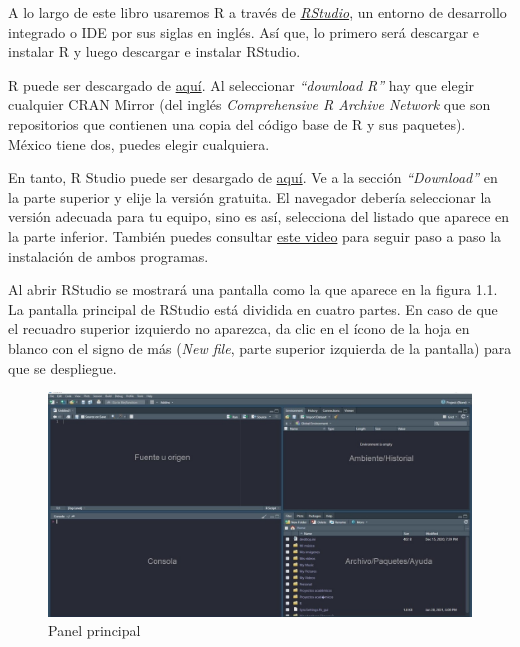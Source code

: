 \documentclass[
  11pt,
  oneside]{book}
\begin{document}
A lo largo de este libro usaremos R a través de \href{https://es.wikipedia.org/wiki/RStudio}{\emph{RStudio}}, un entorno de desarrollo integrado o IDE por sus siglas en inglés. Así que, lo primero será descargar e instalar R y luego descargar e instalar RStudio.

R puede ser descargado de \href{https://www.r-project.org/}{aquí}. Al seleccionar \emph{``download R''} hay que elegir cualquier CRAN Mirror (del inglés \emph{Comprehensive R Archive Network} que son repositorios que contienen una copia del código base de R y sus paquetes). México tiene dos, puedes elegir cualquiera.

En tanto, R Studio puede ser desargado de \href{https://www.rstudio.com/}{aquí}. Ve a la sección \emph{``Download''} en la parte superior y elije la versión gratuita. El navegador debería seleccionar la versión adecuada para tu equipo, sino es así, selecciona del listado que aparece en la parte inferior. También puedes consultar \href{https://youtu.be/zlnm1jLWLeE}{este video} para seguir paso a paso la instalación de ambos programas.

Al abrir RStudio se mostrará una pantalla como la que aparece en la figura 1.1. La pantalla principal de RStudio está dividida en cuatro partes. En caso de que el recuadro superior izquierdo no aparezca, da clic en el ícono de la hoja en blanco con el signo de más (\emph{New file}, parte superior izquierda de la pantalla) para que se despliegue.

\begin{figure}

{\centering \includegraphics[width=1\linewidth]{recursos intro/Figura_1-Entorno} 

}

\caption{Panel principal}\label{fig:unnamed-chunk-2}
\end{figure}
\end{document}
